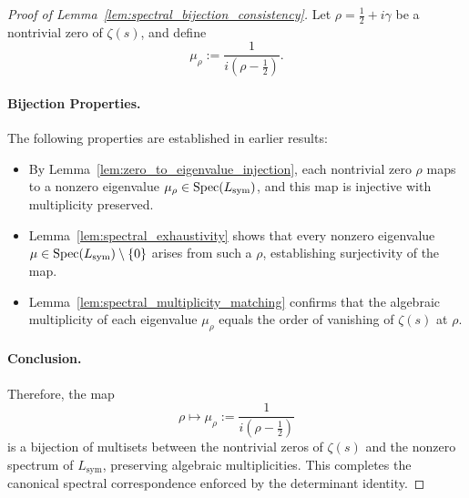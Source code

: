 \begin{proof}[Proof of Lemma~\ref{lem:spectral_bijection_consistency}]
Let \( \rho = \tfrac{1}{2} + i\gamma \) be a nontrivial zero of \( \zeta(s) \), and define
\[
\mu_\rho := \frac{1}{i(\rho - \tfrac{1}{2})}.
\]

\paragraph{Bijection Properties.}
The following properties are established in earlier results:

\begin{itemize}
  \item By Lemma~\ref{lem:zero_to_eigenvalue_injection}, each nontrivial zero \( \rho \) maps to a nonzero eigenvalue \( \mu_\rho \in \operatorname{Spec}(L_{\mathrm{sym}}) \), and this map is injective with multiplicity preserved.

  \item Lemma~\ref{lem:spectral_exhaustivity} shows that every nonzero eigenvalue \( \mu \in \operatorname{Spec}(L_{\mathrm{sym}}) \setminus \{0\} \) arises from such a \( \rho \), establishing surjectivity of the map.

  \item Lemma~\ref{lem:spectral_multiplicity_matching} confirms that the algebraic multiplicity of each eigenvalue \( \mu_\rho \) equals the order of vanishing of \( \zeta(s) \) at \( \rho \).
\end{itemize}

\paragraph{Conclusion.}
Therefore, the map
\[
\rho \mapsto \mu_\rho := \frac{1}{i(\rho - \tfrac{1}{2})}
\]
is a bijection of multisets between the nontrivial zeros of \( \zeta(s) \) and the nonzero spectrum of \( L_{\mathrm{sym}} \), preserving algebraic multiplicities. This completes the canonical spectral correspondence enforced by the determinant identity.
\end{proof}
%  